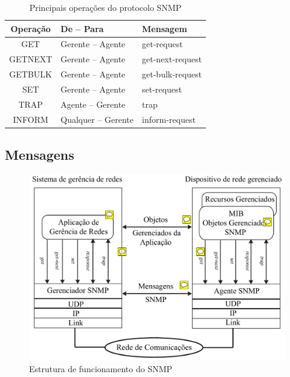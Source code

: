 \documentclass[twoside,english,brazilian]{UNISINOSmonografia}
\begin{document}
\begin{table}
	\centering
	\caption{Principais operações do protocolo SNMP}
	\label{tab:operacoesSNMP}
	\begin{minipage}{.60\textwidth}
		\begin{tabulary}{\textwidth}{|C|L|L|}
	\hline
		\textbf{Operação}   &  
		\textbf{De -- Para} & 
		\textbf{Mensagem}  \\ 
	\hline
		GET     & Gerente -- Agente   & get-request      \\
		GETNEXT & Gerente -- Agente   & get-next-request \\
		GETBULK & Gerente -- Agente   & get-bulk-request \\
		SET     & Gerente -- Agente   & set-request      \\
		TRAP    & Agente -- Gerente   & trap             \\
		INFORM  & Qualquer -- Gerente & inform-request   \\ 
	\hline
		\end{tabulary}
	\end{minipage}
\end{table}

\subsection{Mensagens}
\label{sec:mensagens}

\begin{figure}
	\caption{Estrutura de funcionamento do SNMP}
	\label{fig:snmp-stack}
	\centering
	\begin{minipage}{.8\textwidth}
		\includegraphics[width=\textwidth,keepaspectratio=true]{snmp_stack}
	\end{minipage}
\end{figure}
\end{document}
